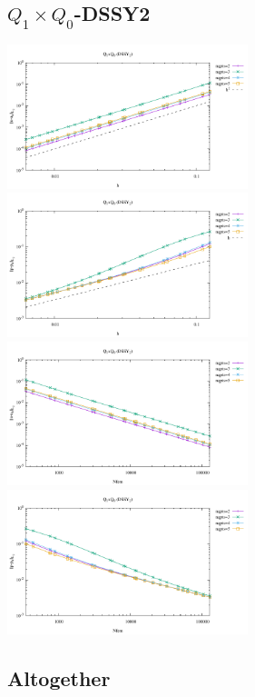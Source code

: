 \subsection*{$Q_1\times Q_0$-DSSY2}
\begin{center}
\includegraphics[width=7cm]{python_codes/fieldstone_120/results/DSSY2Q0-velocity-h.pdf}
\includegraphics[width=7cm]{python_codes/fieldstone_120/results/DSSY2Q0-pressure-h.pdf}
\includegraphics[width=7cm]{python_codes/fieldstone_120/results/DSSY2Q0-velocity-Nfem.pdf}
\includegraphics[width=7cm]{python_codes/fieldstone_120/results/DSSY2Q0-pressure-Nfem.pdf}
\end{center}



\newpage
\subsection*{Altogether}


